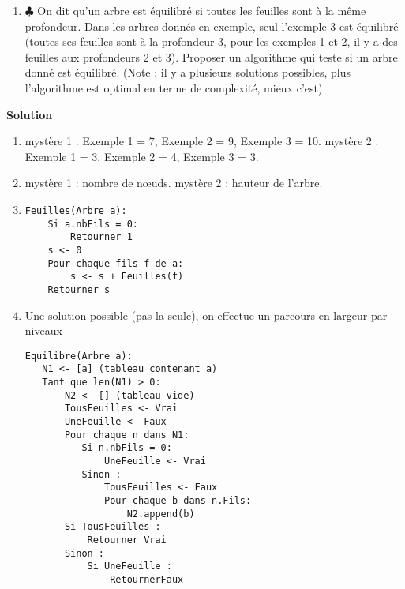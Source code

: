 \begin{exercice}
\begin{enumerate}
\item $\clubsuit$ On dit qu'un arbre est équilibré si toutes les feuilles sont à la même profondeur. Dans les arbres donnés en exemple, seul l'exemple 3 est équilibré (toutes ses feuilles sont à la profondeur 3, pour les exemples 1 et 2, il y a des feuilles aux profondeurs 2 et 3). Proposer un algorithme qui teste si un arbre donné est équilibré. (Note : il y a plusieurs solutions possibles, plus l'algorithme est optimal en terme de complexité, mieux c'est).

\end{enumerate}

\textbf{Solution}

\begin{enumerate}
\item mystère 1 : Exemple 1 = 7, Exemple 2 = 9, Exemple 3 = 10. mystère 2 : Exemple 1 = 3, Exemple 2 = 4, Exemple 3 = 3.

\item mystère 1 : nombre de n\oe uds. mystère 2 : hauteur de l'arbre.

\item 

\begin{lstlisting}
Feuilles(Arbre a):
    Si a.nbFils = 0:
        Retourner 1
    s <- 0
    Pour chaque fils f de a:
        s <- s + Feuilles(f)
    Retourner s
\end{lstlisting}


\item Une solution possible (pas la seule), on effectue un parcours en largeur par niveaux

\begin{lstlisting}
Equilibre(Arbre a):
   N1 <- [a] (tableau contenant a)
   Tant que len(N1) > 0:
       N2 <- [] (tableau vide)
       TousFeuilles <- Vrai
       UneFeuille <- Faux
       Pour chaque n dans N1:
          Si n.nbFils = 0:
              UneFeuille <- Vrai
          Sinon :
              TousFeuilles <- Faux
              Pour chaque b dans n.Fils:
                  N2.append(b)
       Si TousFeuilles :
           Retourner Vrai
       Sinon :
           Si UneFeuille :
               RetournerFaux
       
   
\end{lstlisting}

\end{enumerate}


\end{exercice}